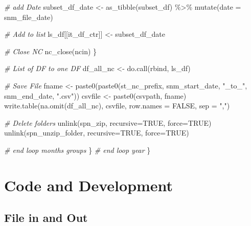 \documentclass[
]{book}
\newenvironment{Shaded}{\begin{snugshade}}{\end{snugshade}}
\newcommand{\AttributeTok}[1]{\textcolor[rgb]{0.77,0.63,0.00}{#1}}
\newcommand{\CommentTok}[1]{\textcolor[rgb]{0.56,0.35,0.01}{\textit{#1}}}
\newcommand{\ConstantTok}[1]{\textcolor[rgb]{0.00,0.00,0.00}{#1}}
\newcommand{\FunctionTok}[1]{\textcolor[rgb]{0.00,0.00,0.00}{#1}}
\newcommand{\NormalTok}[1]{#1}
\newcommand{\OtherTok}[1]{\textcolor[rgb]{0.56,0.35,0.01}{#1}}
\newcommand{\SpecialCharTok}[1]{\textcolor[rgb]{0.00,0.00,0.00}{#1}}
\newcommand{\StringTok}[1]{\textcolor[rgb]{0.31,0.60,0.02}{#1}}
\begin{document}
\begin{Shaded}
\begin{Highlighting}[]
      \CommentTok{\# add Date}
\NormalTok{      subset\_df\_date }\OtherTok{\textless{}{-}} \FunctionTok{as\_tibble}\NormalTok{(subset\_df) }\SpecialCharTok{\%\textgreater{}\%} \FunctionTok{mutate}\NormalTok{(}\AttributeTok{date =}\NormalTok{ snm\_file\_date)}

      \CommentTok{\# Add to list}
\NormalTok{      ls\_df[[it\_df\_ctr]] }\OtherTok{\textless{}{-}}\NormalTok{ subset\_df\_date}

      \CommentTok{\# Close NC}
      \FunctionTok{nc\_close}\NormalTok{(ncin)}
\NormalTok{    \}}

    \CommentTok{\# List of DF to one DF}
\NormalTok{    df\_all\_nc }\OtherTok{\textless{}{-}} \FunctionTok{do.call}\NormalTok{(rbind, ls\_df)}

    \CommentTok{\# Save File}
\NormalTok{    fname }\OtherTok{\textless{}{-}} \FunctionTok{paste0}\NormalTok{(}\FunctionTok{paste0}\NormalTok{(st\_nc\_prefix,}
\NormalTok{                           snm\_start\_date, }\StringTok{"\_to\_"}\NormalTok{, snm\_end\_date,}
                           \StringTok{".csv"}\NormalTok{))}
\NormalTok{    csvfile }\OtherTok{\textless{}{-}} \FunctionTok{paste0}\NormalTok{(csvpath, fname)}
    \FunctionTok{write.table}\NormalTok{(}\FunctionTok{na.omit}\NormalTok{(df\_all\_nc), csvfile, }\AttributeTok{row.names =} \ConstantTok{FALSE}\NormalTok{, }\AttributeTok{sep =} \StringTok{","}\NormalTok{)}

    \CommentTok{\# Delete folders}
    \FunctionTok{unlink}\NormalTok{(spn\_zip, }\AttributeTok{recursive=}\ConstantTok{TRUE}\NormalTok{, }\AttributeTok{force=}\ConstantTok{TRUE}\NormalTok{)}
    \FunctionTok{unlink}\NormalTok{(spn\_unzip\_folder, }\AttributeTok{recursive=}\ConstantTok{TRUE}\NormalTok{, }\AttributeTok{force=}\ConstantTok{TRUE}\NormalTok{)}

  \CommentTok{\# end loop months groups}
\NormalTok{  \}}
\CommentTok{\# end loop year}
\NormalTok{\}}
\end{Highlighting}
\end{Shaded}

\hypertarget{code-and-development}{%
\chapter{Code and Development}\label{code-and-development}}

\hypertarget{file-in-and-out}{%
\section{File in and Out}\label{file-in-and-out}}
\end{document}
